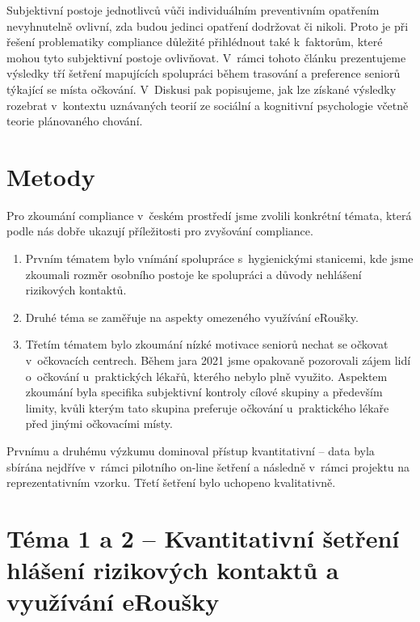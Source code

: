 Subjektivní postoje jednotlivců vůči individuálním preventivním opatřením nevyhnutelně ovlivní, zda budou jedinci opatření dodržovat či nikoli. Proto je při řešení problematiky compliance důležité přihlédnout také k~faktorům, které mohou tyto subjektivní postoje ovlivňovat. V~rámci tohoto článku prezentujeme výsledky tří šetření mapujících spolupráci během trasování a preference seniorů týkající se místa očkování. V~Diskusi pak popisujeme, jak lze získané výsledky rozebrat v~kontextu uznávaných teorií ze sociální a kognitivní psychologie včetně teorie plánovaného chování.

\section*{Metody} 

Pro zkoumání compliance v~českém prostředí jsme zvolili konkrétní témata, která podle nás dobře ukazují příležitosti pro zvyšování compliance.

\begin{enumerate}
\item Prvním tématem bylo vnímání spolupráce s~hygienickými stanicemi, kde jsme zkoumali rozměr osobního postoje ke spolupráci a důvody nehlášení rizikových kontaktů. 
\item Druhé téma se zaměřuje na aspekty omezeného využívání eRoušky.
\item Třetím tématem bylo zkoumání nízké motivace seniorů nechat se očkovat v~očkovacích centrech. Během jara 2021 jsme opakovaně pozorovali zájem lidí o~očkování u~praktických lékařů, kterého nebylo plně využito. Aspektem zkoumání byla specifika subjektivní kontroly cílové skupiny a především limity, kvůli kterým tato skupina preferuje očkování u~praktického lékaře před jinými očkovacími místy.
\end{enumerate}

Prvnímu a druhému výzkumu dominoval přístup kvantitativní -- data byla sbírána nejdříve v~rámci pilotního on-line šetření a následně v~rámci projektu  na reprezentativním vzorku. Třetí šetření bylo uchopeno kvalitativně.

\section*{Téma 1 a 2 – Kvantitativní šetření hlášení rizikových kontaktů a využívání eRoušky}
